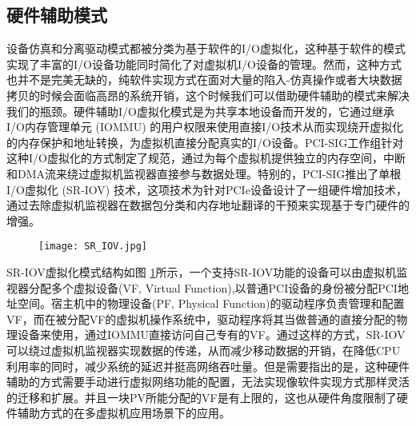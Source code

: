 \subsection{硬件辅助模式}
设备仿真和分离驱动模式都被分类为基于软件的I/O虚拟化，这种基于软件的模式实现了丰富的I/O设备功能同时简化了对虚拟机I/O设备的管理。然而，这种方式也并不是完美无缺的，纯软件实现方式在面对大量的陷入-仿真操作或者大块数据拷贝的时候会面临高昂的系统开销，这个时候我们可以借助硬件辅助的模式来解决我们的瓶颈。硬件辅助I/O虚拟化模式是为共享本地设备而开发的，它通过继承I/O内存管理单元 (IOMMU) 的用户权限来使用直接I/O技术从而实现绕开虚拟化的内存保护和地址转换，为虚拟机直接分配真实的I/O设备。PCI-SIG工作组针对这种I/O虚拟化的方式制定了规范，通过为每个虚拟机提供独立的内存空间，中断和DMA流来绕过虚拟机监视器直接参与数据处理。特别的，PCI-SIG推出了单根I/O虚拟化 (SR-IOV) 技术，这项技术为针对PCIe设备设计了一组硬件增加技术，通过去除虚拟机监视器在数据包分类和内存地址翻译的干预来实现基于专门硬件的增强。
\begin{figure}[!htp]
	\label{fig:hardware_ass}
	\centering
	\texttt{[image: SR\_IOV.jpg]}
\end{figure}
SR-IOV虚拟化模式结构如图 \ref{fig:hardware_ass}所示，一个支持SR-IOV功能的设备可以由虚拟机监视器分配多个虚拟设备(VF, Virtual Function),以普通PCI设备的身份被分配PCI地址空间。宿主机中的物理设备(PF, Physical Function)的驱动程序负责管理和配置VF，而在被分配VF的虚拟机操作系统中，驱动程序将其当做普通的直接分配的物理设备来使用，通过IOMMU直接访问自己专有的VF。通过这样的方式，SR-IOV可以绕过虚拟机监视器实现数据的传递，从而减少移动数据的开销，在降低CPU利用率的同时，减少系统的延迟并挺高网络吞吐量。但是需要指出的是，这种硬件辅助的方式需要手动进行虚拟网络功能的配置，无法实现像软件实现方式那样灵活的迁移和扩展。并且一块PV所能分配的VF是有上限的，这也从硬件角度限制了硬件辅助方式的在多虚拟机应用场景下的应用。


